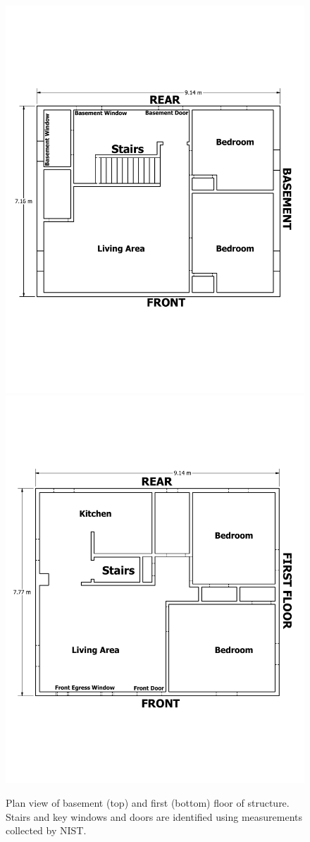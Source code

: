 \documentclass[12pt,oneside]{book}
\begin{document}
\begin{figure}[!ht]
\includegraphics[width=.7\textwidth]{../Figures/Basement} \\
\vspace{0.2in}
\includegraphics[width=.7\textwidth]{../Figures/First_Floor}
\caption[Plan view of basement (top) and first (bottom) floor of structure.]{Plan view of basement (top) and first (bottom) floor of structure. Stairs and key windows and doors are identified using measurements collected by NIST.}
\label{fig:simp_geom}
\end{figure}
\end{document}

